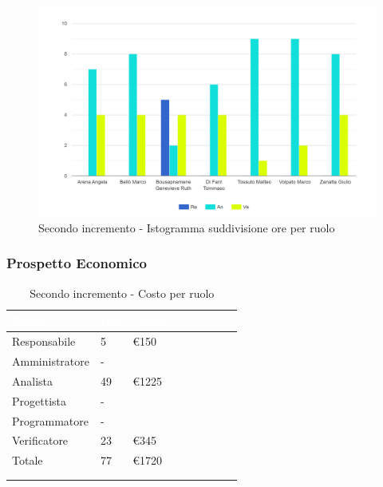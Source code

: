 {{\begin{longtable}{C{.4\freewidth} C{.1\freewidth} C{.1\freewidth} C{.1\freewidth} C{.1\freewidth} C{.1\freewidth} C{.1\freewidth} C{.1\freewidth} C{.1\freewidth}}
      \end{longtable} 
      \begin{figure}[H]
        \includegraphics[width=15cm]{sezioni/images/secondo.png}
        \centering
        \caption{Secondo incremento - Istogramma suddivisione ore per ruolo}
     \end{figure}
      
    }
    

    \subsubsection{Prospetto Economico}
    {
        \setlength{\freewidth}{\dimexpr\textwidth-30\tabcolsep}
        \renewcommand{\arraystretch}{1.0}
        \setlength{\aboverulesep}{0pt}
        \setlength{\belowrulesep}{0pt}
        \begin{longtable}{C{.4\freewidth} C{.2\freewidth} C{.2\freewidth} C{.2\freewidth} C{.2\freewidth} C{.2\freewidth} C{.2\freewidth} C{.2\freewidth} C{.2\freewidth}}
          \toprule
        \textcolor{white}{\textbf{Ruolo}}&
        \textcolor{white}{\textbf{Ore}}&
        \textcolor{white}{\textbf{Costo}}\\
        \toprule
        \endhead
            
        Responsabile  & 5 & \euro150\\        
        Amministratore  & -&  \\        
        Analista &49 & \euro1225\\        
        Progettista &- &\\        
        Programmatore &- & \\        
        Verificatore &23 &\euro345\\        
        Totale&77&\euro1720\\
        \bottomrule
      	\\
        \caption{Secondo incremento - Costo per ruolo}


\end{longtable}}}
